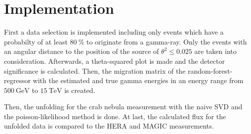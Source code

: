 \section{Implementation}
\label{sec:durch}
First a data selection is implemented
including only events which have a probabilty of at least $\SI{80}{\percent}$ to
originate from a gamma-ray.
Only the events with an angular distance to the position of the source of $\theta^2 \leq \num{0.025}$ are taken into consideration.
Afterwards, a theta-squared plot is made and the detector significance is calculated.
Then, the migration matrix of the random-forest-regressor with the estimated and true gamma energies in an
energy range from $\SI{500}{\giga\electronvolt}$ to $\SI{15}{\tera\electronvolt}$ is created. \par

Then, the unfolding for the crab nebula measurement with the naive SVD and the poisson-likelihood method is done.
At last, the calculated flux for the unfolded data is compared to the HERA and MAGIC measurements.
